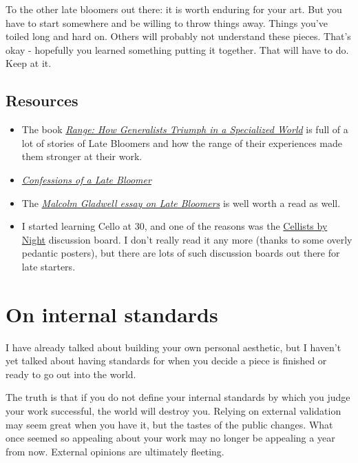 \documentclass[
]{book}
\providecommand{\tightlist}{%
  \setlength{\itemsep}{0pt}\setlength{\parskip}{0pt}}
\begin{document}
To the other late bloomers out there: it is worth enduring for your art. But you have to start somewhere and be willing to throw things away. Things you've toiled long and hard on. Others will probably not understand these pieces. That's okay - hopefully you learned something putting it together. That will have to do. Keep at it.

\hypertarget{resources-6}{%
\section{Resources}\label{resources-6}}

\begin{itemize}
\tightlist
\item
  The book \href{https://davidepstein.com/the-range/}{\emph{Range: How Generalists Triumph in a Specialized World}} is full of a lot of stories of Late Bloomers and how the range of their experiences made them stronger at their work.
\item
  \href{https://www.psychologytoday.com/us/articles/200811/confessions-late-bloomer}{\emph{Confessions of a Late Bloomer}}
\item
  The \href{http://www.newyorker.com/magazine/2008/10/20/late-bloomers-2}{\emph{Malcolm Gladwell essay on Late Bloomers}} is well worth a read as well.
\item
  I started learning Cello at 30, and one of the reasons was the \href{http://cellofun.yuku.com/forums/2/Cellists-by-Night-Forum}{Cellists by Night} discussion board. I don't really read it any more (thanks to some overly pedantic posters), but there are lots of such discussion boards out there for late starters.
\end{itemize}

\hypertarget{on-internal-standards}{%
\chapter{On internal standards}\label{on-internal-standards}}

I have already talked about building your own personal aesthetic, but I haven't yet talked about having standards for when you decide a piece is finished or ready to go out into the world.

The truth is that if you do not define your internal standards by which you judge your work successful, the world will destroy you. Relying on external validation may seem great when you have it, but the tastes of the public changes. What once seemed so appealing about your work may no longer be appealing a year from now. External opinions are ultimately fleeting.
\end{document}
